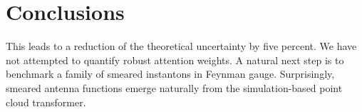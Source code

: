 \section{Conclusions}\label{sec:conclusions}

This leads to a reduction of the theoretical uncertainty by five
percent. We have not attempted to quantify robust attention weights. A
natural next step is to benchmark a family of smeared instantons in
Feynman gauge. Surprisingly, smeared antenna functions emerge naturally
from the simulation-based point cloud transformer.

